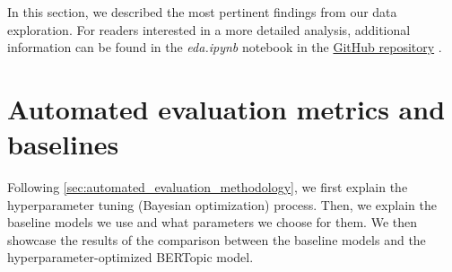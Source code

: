 \begin{figure}[h]
    \centering
    \hfill
    \caption{}
    \label{fig:url_and_readability_analysis}
\end{figure}

In this section, we described the most pertinent findings from our data exploration. For readers interested in a more detailed analysis, additional information can be found in the \textit{eda.ipynb} notebook in the \href{https://github.com/ivangermanov/openml-tags}{GitHub repository} \cite{germanov_topic_modeling_of_2024}.

\section{Automated evaluation metrics and baselines}
\label{sec:automated_evaluation_results}
Following \cref{sec:automated_evaluation_methodology}, we first explain the hyperparameter tuning (Bayesian optimization) process. Then, we explain the baseline models we use and what parameters we choose for them. We then showcase the results of the comparison between the baseline models and the hyperparameter-optimized BERTopic model.

